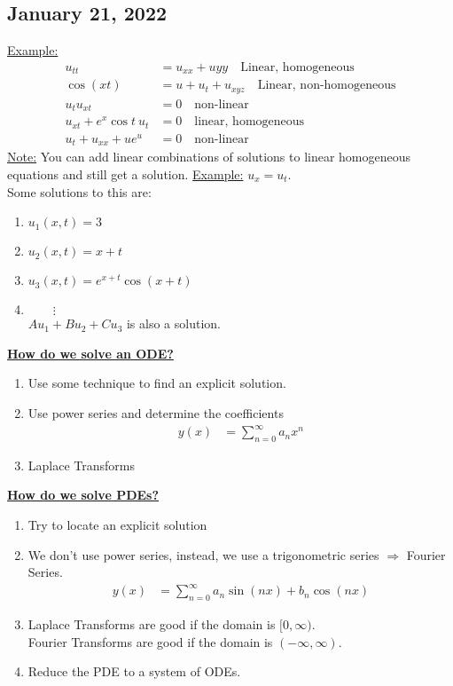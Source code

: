 \documentclass{article}
\newcommand{\topic}[1]{\textbf{\underline{#1}}}
\newcommand{\Ex}{\underline{Example:} }
\newcommand{\note}{\underline{Note:} }
\begin{document}
\subsection{January 21, 2022}
\Ex
\begin{align}
  u_{tt} & = u_{xx} + u{yy}\quad \text{Linear, homogeneous}\\
  \cos{(xt)} & = u + u_t + u_{xyz}\quad \text{Linear, non-homogeneous}\\
  u_tu_{xt} & = 0\quad \text{non-linear}\\
  u_{xt} + e^x \cos t\ u_t & = 0\quad \text{linear, homogeneous}\\
  u_t + u_{xx} + ue^u & = 0\quad \text{non-linear}
\end{align}
\note You can add linear combinations of solutions to linear homogeneous equations and still get a solution.
\Ex $u_x = u_t$.\\
Some solutions to this are:
\begin{enumerate}
  \item $u_1(x, t) = 3$
  \item $u_2(x, t) = x + t$
  \item $u_3(x, t) = e^{x+t} \cos(x + t)$
  \item $\qquad \vdots$\\
  $Au_1 + Bu_2 + Cu_3$ is also a solution.
\end{enumerate}
\topic{How do we solve an ODE?}
\begin{enumerate}
  \item Use some technique to find an explicit solution.
  \item Use power series and determine the coefficients
  \begin{align}
    y(x) & = \sum^\infty_{n = 0} a_nx^n
  \end{align}
  \item Laplace Transforms
\end{enumerate}
\topic{How do we solve PDEs?}
\begin{enumerate}
  \item Try to locate an explicit solution
  \item We don't use power series, instead, we use a trigonometric series $\Rightarrow$ Fourier Series.
  \begin{align}
    y(x) & = \sum^\infty_{n = 0} a_n \sin(nx) + b_n \cos(nx)
  \end{align}
  \item Laplace Transforms are good if the domain is $[0, \infty)$.\\
  Fourier Transforms are good if the domain is $(-\infty, \infty)$.
  \item Reduce the PDE to a system of ODEs.
\end{enumerate}
\end{document}
